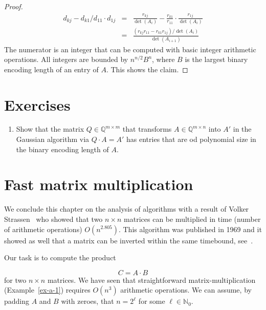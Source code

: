 \begin{proof}
  \begin{eqnarray*}\displaystyle
   d_{kj} - d_{k1}/d_{11} ⋅  d_{1j} & = & \frac{r_{kj}} {\det(A_{i})} - \frac{r_{k1}  }{r_{11}} ⋅ \frac{r_{1j}}{\det(A_{i})}  \\
                                    & = &  \frac{(r_{kj} r_{11} - r_{k1} r_{1j}) / \det(A_{i})}
                                          {\det(A_{i+1})}
 \end{eqnarray*}
 The numerator is an integer that can be computed with basic integer arithmetic operations. All integers are bounded by $n^{n/2} B^n$, where $B$ is the largest binary encoding length of an entry of $A$. This shows the claim. 
 
\end{proof}






\section*{Exercises} 
\label{sec:exercises}

\begin{enumerate}
\item \label{item:3} Show that the matrix $Q ∈ ℚ^{m × m}$ that transforms $A \in ℚ^{m × n}$ into $A'$ in the Gaussian algorithm via $Q ⋅A = A'$ has entries that are od polynomial size in the binary encoding length of $A$. 
\end{enumerate}


\section{Fast matrix multiplication} 
\label{sec:fast-matr-mult}


We conclude this chapter on the analysis of algorithms with a result
of Volker Strassen~\cite{strassen1969gaussian} who showed that two
$n ×n$
matrices can be multiplied in time (number of arithmetic operations)
$O(n^{2.805})$.
This algorithm was published in 1969 and it showed as well that a
matrix can be inverted within the same timebound, see~\cite{AHU74}. 

Our task is to compute the product 

\begin{equation}
  \label{eq:str:1}
C =   A \cdot B  
\end{equation}
for two $n ×n$ matrices. We have seen that straightforward matrix-multiplication (Example~\ref{ex-a-1}) requires $O(n^3)$ arithmetic operations. 
We can assume, by padding $A$ and $B$ with zeroes, that $n = 2^\ell$ for some $\ell ∈ ℕ_0$. 

